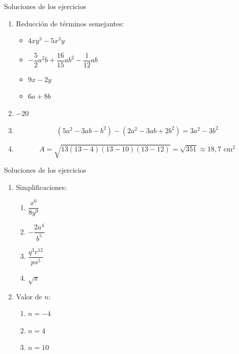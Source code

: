 \documentclass[10pt,handout,aspectratio=169]{beamer}
\newenvironment{stepenumerate}{\begin{enumerate}[<+->]}{\end{enumerate}}
\begin{document}
	\begin{frame}{Soluciones de los ejercicios}
		\begin{enumerate}
			\item Reducción de términos semejantes:
			
			\begin{itemize}
				\item $4xy^{3}-5x^{3}y$
				\item $-\dfrac{5}{2}a^{2}b+\dfrac{16}{15}ab^{2}-\dfrac{1}{12}ab$
				\item $9x-2y$
				\item $6a+8b$
			\end{itemize}
			
			\item $-20$
			
			\item 
			\[
			(5a^{2}-3ab-b^{2})-(2a^{2}-3ab+2b^{2})=3a^{2}-3b^{2}
			\]
			
			\item 
			\[
			A=\sqrt{13(13-4)(13-10)(13-12)}=\sqrt{351}\approx 18{,}7\text{ cm}^{2}
			\]
		\end{enumerate}
	\end{frame}
	
	\begin{frame}{Soluciones de los ejercicios}
		\begin{stepenumerate}
			\item Simplificaciones:
			
			\begin{stepenumerate}
				\item $\dfrac{x^{6}}{8y^{9}}$
				\item $-\dfrac{2a^{4}}{b^{5}}$
				\item $\dfrac{q^{3}r^{12}}{ps^{5}}$
				\item $\sqrt{x}$
			\end{stepenumerate}
			
			\item Valor de $n$:
			
			\begin{stepenumerate}
				\item $n=-4$
				\item $n=4$
				\item $n=10$
			\end{stepenumerate}
		\end{stepenumerate}
	\end{frame}
	
\end{document}
